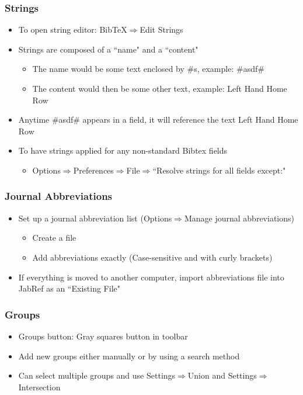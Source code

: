 \documentclass[10pt]{beamer}
\begin{document}
\begin{frame}
\frametitle{Strings}
\begin{itemize}
\item To open string editor: BibTeX$\Rightarrow$Edit Strings
\item Strings are composed of a ``name" and a ``content"
	\begin{itemize}
	\item The name would be some text enclosed by \#s, example: \#asdf\#
	\item The content would then be some other text, example: Left Hand Home Row
	\end{itemize}
\item Anytime \#asdf\# appears in a field, it will reference the text Left Hand Home Row
\item To have strings applied for any non-standard Bibtex fields
	\begin{itemize}	
	\item Options$\Rightarrow$Preferences$\Rightarrow$File$\Rightarrow$``Resolve strings for all fields except:"
	\end{itemize}
\end{itemize}
\end{frame}

\begin{frame}
\frametitle{Journal Abbreviations}
\begin{itemize}
\item Set up a journal 
abbreviation list (Options$\Rightarrow$Manage journal abbreviations)
	\begin{itemize}
	\item Create a file
	\item Add abbreviations exactly (Case-sensitive and with curly brackets)
	\end{itemize}
\item If everything is moved to another computer, import abbreviations file into JabRef as an ``Existing File"
\end{itemize}
\end{frame}

\begin{frame}
\frametitle{Groups}
\begin{itemize}
\item Groups button: Gray squares button in toolbar
\item Add new groups either manually or by using a search method
\item Can select multiple groups and use Settings$\Rightarrow$Union and Settings$\Rightarrow$Intersection
\end{itemize}
\end{frame}
\end{document}
